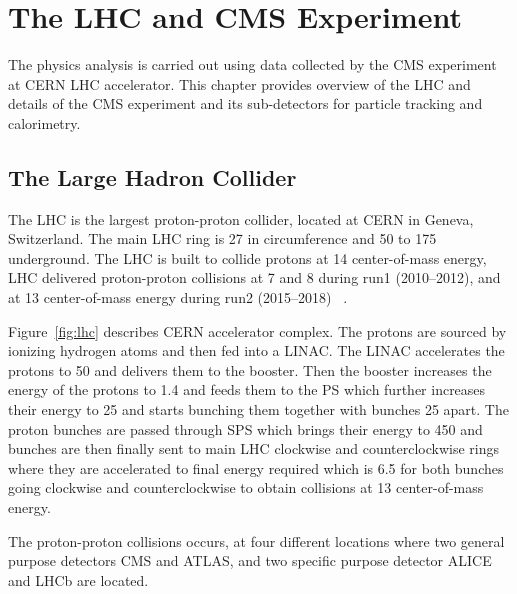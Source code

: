 \chapter{
  The LHC and CMS Experiment
 }\label{ch_cms}

The physics analysis is carried out using data collected by the \gls{CMS} experiment at
\gls{CERN} \gls{LHC} accelerator. This chapter provides overview of the \gls{LHC}
and details of the CMS experiment and its sub-detectors for particle tracking
and calorimetry.

\section{
  The Large Hadron Collider
 }\label{ch_cms:lhc}

The \gls{LHC} is the largest proton-proton
collider, located at
\gls{CERN} in Geneva, Switzerland.
The main \gls{LHC} ring is 27\km{} in circumference
and 50 to 175\m{} underground.
The \gls{LHC} is built to collide protons at 14\TeV{} center-of-mass energy,
LHC delivered proton-proton collisions at 7 and 8\TeV{}
during run1 (2010--2012), and at 13\TeV{} center-of-mass energy during
run2 (2015--2018)
~\cite{Evans:2008}.

Figure~\ref{fig:lhc} describes \gls{CERN} accelerator complex.
The protons are sourced by ionizing hydrogen atoms
and then fed into a \gls{LINAC}.
The \gls{LINAC} accelerates the protons to 50\MeV{} and delivers them to the booster.
Then the booster increases the energy of the protons to 1.4\GeV{} and
feeds them to the \gls{PS} which further increases their energy to 25\GeV{}
and starts bunching them together with bunches 25\nanoseconds{} apart.
The proton bunches are passed through \gls{SPS} which brings their energy
to 450\GeV{} and bunches are then finally sent to main \gls{LHC} clockwise and counterclockwise
rings where they are accelerated to final energy required which is 6.5\TeV{}
for both bunches going clockwise and counterclockwise
to obtain collisions at 13\TeV{} center-of-mass energy.

The proton-proton collisions occurs, at four different locations where two
general purpose detectors \gls{CMS} and \gls{ATLAS}, and
two specific purpose detector \gls{ALICE} and \gls{LHCb} are located.

